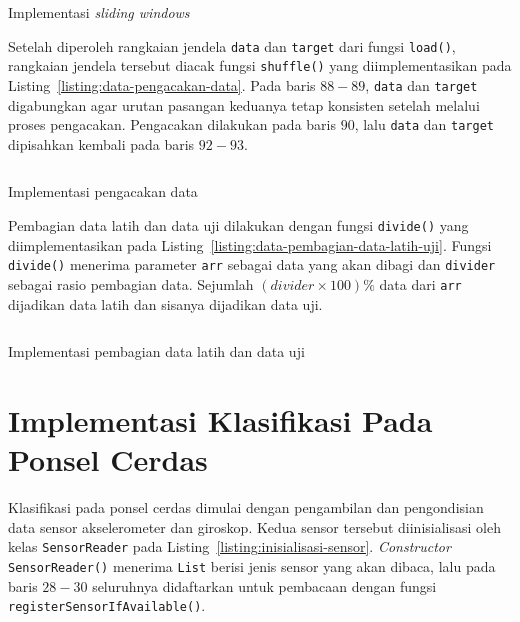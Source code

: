 \begin{listing}[h]
    \inputminted[firstline=60,firstnumber=60,lastline=79]{python}{../har/data.py}
    \caption{Implementasi \textit{sliding windows}}
    \label{listing:data-sliding-window}
\end{listing}

Setelah diperoleh rangkaian jendela \texttt{data} dan \texttt{target} dari fungsi \texttt{load()}, rangkaian jendela tersebut diacak fungsi \texttt{shuffle()} yang diimplementasikan pada Listing~\ref{listing:data-pengacakan-data}. Pada baris $88-89$, \texttt{data} dan \texttt{target} digabungkan agar urutan pasangan keduanya tetap konsisten setelah melalui proses pengacakan. Pengacakan dilakukan pada baris $90$, lalu \texttt{data} dan \texttt{target} dipisahkan kembali pada baris $92-93$.

\begin{listing}[h]
    \inputminted[firstline=82,firstnumber=82,lastline=95]{python}{../har/data.py}
    \caption{Implementasi pengacakan data}
    \label{listing:data-pengacakan-data}
\end{listing}

Pembagian data latih dan data uji dilakukan dengan fungsi \texttt{divide()} yang diimplementasikan pada Listing~\ref{listing:data-pembagian-data-latih-uji}. Fungsi \texttt{divide()} menerima parameter \texttt{arr} sebagai data yang akan dibagi dan \texttt{divider} sebagai rasio pembagian data. Sejumlah $(divider \times 100) \%$ data dari \texttt{arr} dijadikan data latih dan sisanya dijadikan data uji.

\begin{listing}[h]
    \inputminted[firstline=98,firstnumber=98,lastline=107]{python}{../har/data.py}
    \caption{Implementasi pembagian data latih dan data uji}
    \label{listing:data-pembagian-data-latih-uji}
\end{listing}

\section{Implementasi Klasifikasi Pada Ponsel Cerdas}
Klasifikasi pada ponsel cerdas dimulai dengan pengambilan dan pengondisian data sensor akselerometer dan giroskop. Kedua sensor tersebut diinisialisasi oleh kelas \texttt{SensorReader} pada Listing~\ref{listing:inisialisasi-sensor}. \textit{Constructor} \texttt{SensorReader()} menerima \texttt{List} berisi jenis sensor yang akan dibaca, lalu pada baris $28-30$ seluruhnya didaftarkan untuk pembacaan dengan fungsi \texttt{registerSensorIfAvailable()}.

